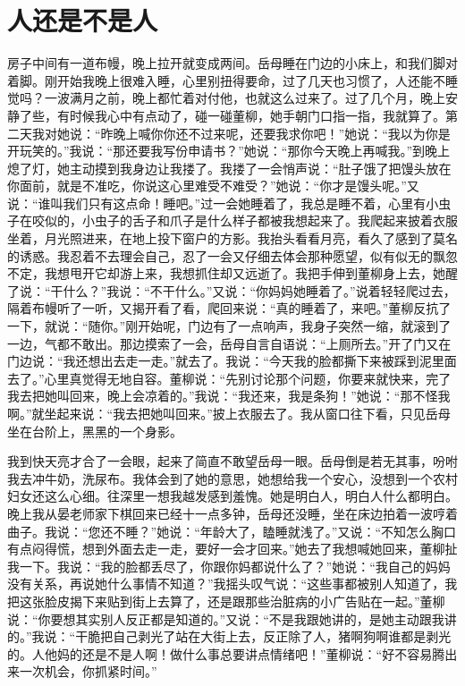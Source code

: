 \documentclass[12pt,oneside]{book}
\begin{document}
\chapter{人还是不是人}

房子中间有一道布幔，晚上拉开就变成两间。岳母睡在门边的小床上，和我们脚对着脚。刚开始我晚上很难入睡，心里别扭得要命，过了几天也习惯了，人还能不睡觉吗？一波满月之前，晚上都忙着对付他，也就这么过来了。过了几个月，晚上安静了些，有时候我心中有点动了，碰一碰董柳，她手朝门口指一指，我就算了。第二天我对她说：``昨晚上喊你你还不过来呢，还要我求你吧！''她说：``我以为你是开玩笑的。''我说：``那还要我写份申请书？''她说：``那你今天晚上再喊我。''到晚上熄了灯，她主动摸到我身边让我搂了。我搂了一会悄声说：``肚子饿了把馒头放在你面前，就是不准吃，你说这心里难受不难受？''她说：``你才是馒头呢。''又说：``谁叫我们只有这点命！睡吧。''过一会她睡着了，我总是睡不着，心里有小虫子在咬似的，小虫子的舌子和爪子是什么样子都被我想起来了。我爬起来披着衣服坐着，月光照进来，在地上投下窗户的方影。我抬头看看月亮，看久了感到了莫名的诱惑。我忍着不去理会自己，忍了一会又仔细去体会那种愿望，似有似无的飘忽不定，我想甩开它却游上来，我想抓住却又远逝了。我把手伸到董柳身上去，她醒了说：``干什么？''我说：``不干什么。''又说：``你妈妈她睡着了。''说着轻轻爬过去，隔着布幔听了一听，又揭开看了看，爬回来说：``真的睡着了，来吧。''董柳反抗了一下，就说：``随你。''刚开始呢，门边有了一点响声，我身子突然一缩，就滚到了一边，气都不敢出。那边摸索了一会，岳母自言自语说：``上厕所去。''开了门又在门边说：``我还想出去走一走。''就去了。我说：``今天我的脸都撕下来被踩到泥里面去了。''心里真觉得无地自容。董柳说：``先别讨论那个问题，你要来就快来，完了我去把她叫回来，晚上会凉着的。''我说：``我还来，我是条狗！''她说：``那不怪我啊。''就坐起来说：``我去把她叫回来。''披上衣服去了。我从窗口往下看，只见岳母坐在台阶上，黑黑的一个身影。

我到快天亮才合了一会眼，起来了简直不敢望岳母一眼。岳母倒是若无其事，吩咐我去冲牛奶，洗尿布。我体会到了她的意思，她想给我一个安心，没想到一个农村妇女还这么心细。往深里一想我越发感到羞愧。她是明白人，明白人什么都明白。晚上我从晏老师家下棋回来已经十一点多钟，岳母还没睡，坐在床边拍着一波哼着曲子。我说：``您还不睡？''她说：``年龄大了，瞌睡就浅了。''又说：``不知怎么胸口有点闷得慌，想到外面去走一走，要好一会才回来。''她去了我想喊她回来，董柳扯我一下。我说：``我的脸都丢尽了，你跟你妈都说什么了？''她说：``我自己的妈妈没有关系，再说她什么事情不知道？''我摇头叹气说：``这些事都被别人知道了，我把这张脸皮揭下来贴到街上去算了，还是跟那些治脏病的小广告贴在一起。''董柳说：``你要想其实别人反正都是知道的。''又说：``不是我跟她讲的，是她主动跟我讲的。''我说：``干脆把自己剥光了站在大街上去，反正除了人，猪啊狗啊谁都是剥光的。人他妈的还是不是人啊！做什么事总要讲点情绪吧！''董柳说：``好不容易腾出来一次机会，你抓紧时间。''
\end{document}
